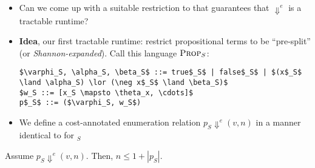 \documentclass{tufte-handout}
\begin{document}
\begin{itemize}
  \item Can we come up with a suitable restriction to \prop{} that guarantees 
  that $\Downarrow^e$ is a tractable runtime?

  \item \textbf{Idea}, our first tractable runtime: restrict propositional terms
  to be ``pre-split'' (or \emph{Shannon-expanded}). Call this language $\textsc{Prop}{}_{S}$:

\begin{lstlisting}[mathescape=true]
$\varphi_S, \alpha_S, \beta_S$ ::= true$_S$ | false$_S$ | $(x$_S$ \land \alpha_S) \lor (\neg x$_S$ \land \beta_S)$
$w_S ::= [x_S \mapsto \theta_x, \cdots]$
p$_S$ ::= ($\varphi_S, w_S$)
\end{lstlisting}
\item We define a cost-annotated enumeration relation $p_S \Downarrow^e (v, n)$ in a manner 
identical to \prop{} for \prop{}$_S$
\end{itemize}

\begin{theorem}
  Assume $p_S \Downarrow^e (v, n)$. Then, $n \le 1 + |p_S|$.
\end{theorem}
\end{document}
